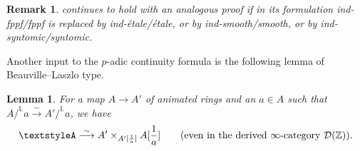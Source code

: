 \documentclass[11pt, reqno]{amsart}
\newcommand{\bL}{\mathbb{L}}
\newcommand{\bZ}{\mathbb{Z}}
\newcommand{\cD}{\mathcal{D}}
\newcommand{\isomto}{\overset{\sim}{\longrightarrow}}
\newcommand{\ra}{\rightarrow}
\providecommand{\up}[1]{{\upshape(}#1{\upshape)}}
\providecommand{\f}[2]{\frac{#1}{#2}}
\newcommand{\blem}{\begin{lemma}}
\newcommand{\elem}{\end{lemma}}
\newcommand{\x}{\text}
\providecommand{\qxq}[1]{\quad\text{#1}\quad}
\providecommand{\qx}[1]{\quad\text{#1}}
\newcommand{\q}{\quad}
\newcommand{\tst}{\textstyle}
\newcommand{\brem}{\begin{rem}}
\newcommand{\erem}{\end{rem}}
\numberwithin{equation}{numberingbase}
\theoremstyle{thms}
\newtheorem{lemma}[numberingbase]{Lemma}
\theoremstyle{claims}
\theoremstyle{defs}
\newtheorem{rem}[numberingbase]{Remark}
\theoremstyle{thms}
\theoremstyle{defs}
\theoremstyle{subsection-tweak}
\theoremstyle{subsection-tweak}
\begin{document}
\brem
{} continues to hold with an analogous proof if in its formulation ind-fppf/fppf is replaced by ind-\'{e}tale/\'{e}tale, or by ind-smooth/smooth, or by ind-syntomic/syntomic.
\erem



















Another input to the $p$-adic continuity formula is the following lemma of Beauville--Laszlo type.

\blem \label{lem:derived-BL-key}
For a map $A \ra A'$ of animated rings and an $a\in A$ such that $A/^\bL a \isomto A'/^\bL a$, we have
\[
\tst %
A \isomto A' \times_{A'[\f{1}{a}]} A[\f{1}{a}] \q\qx{\up{even in the derived $\infty$-category $\cD(\bZ)$}.}
\]
\elem
\end{document}

